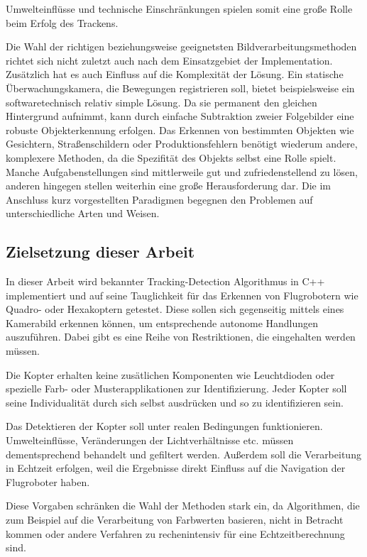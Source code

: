 Umwelteinflüsse und technische Einschränkungen spielen somit eine große Rolle beim Erfolg des Trackens\cite{OTS}. 

Die Wahl der richtigen beziehungsweise geeignetsten Bildverarbeitungsmethoden richtet sich nicht zuletzt auch nach dem Einsatzgebiet der Implementation. Zusätzlich hat es auch Einfluss auf die Komplexität der Lösung. Ein statische Überwachungskamera, die Bewegungen registrieren soll, bietet beispielsweise ein softwaretechnisch relativ simple Lösung. Da sie permanent den gleichen Hintergrund aufnimmt, kann durch einfache Subtraktion zweier Folgebilder eine robuste Objekterkennung erfolgen. Das Erkennen von bestimmten Objekten wie Gesichtern, Straßenschildern oder Produktionsfehlern benötigt wiederum andere, komplexere Methoden, da die Spezifität des Objekts selbst eine Rolle spielt. Manche Aufgabenstellungen sind mittlerweile gut und zufriedenstellend zu lösen, anderen hingegen stellen weiterhin eine große Herausforderung dar. Die im Anschluss kurz vorgestellten Paradigmen begegnen den Problemen auf unterschiedliche Arten und Weisen.

\subsection{Zielsetzung dieser Arbeit}
In dieser Arbeit wird bekannter Tracking-Detection Algorithmus in C++ implementiert und auf seine Tauglichkeit für das Erkennen von Flugrobotern wie Quadro- oder Hexakoptern getestet. Diese sollen sich gegenseitig mittels eines Kamerabild erkennen können, um entsprechende autonome Handlungen auszuführen. Dabei gibt es eine Reihe von Restriktionen, die eingehalten werden müssen.

Die Kopter erhalten keine zusätlichen Komponenten wie Leuchtdioden oder spezielle Farb- oder Musterapplikationen zur Identifizierung. Jeder Kopter soll seine Individualität durch sich selbst ausdrücken und so zu identifizieren sein.

Das Detektieren der Kopter soll unter realen Bedingungen funktionieren. Umwelteinflüsse, Veränderungen der Lichtverhältnisse etc. müssen dementsprechend behandelt und gefiltert werden. Außerdem soll die Verarbeitung in Echtzeit erfolgen, weil die Ergebnisse direkt Einfluss auf die Navigation der Flugroboter haben.

Diese Vorgaben schränken die Wahl der Methoden stark ein, da Algorithmen, die zum Beispiel auf die Verarbeitung von Farbwerten basieren, nicht in Betracht kommen oder andere Verfahren zu rechenintensiv für eine Echtzeitberechnung sind.

